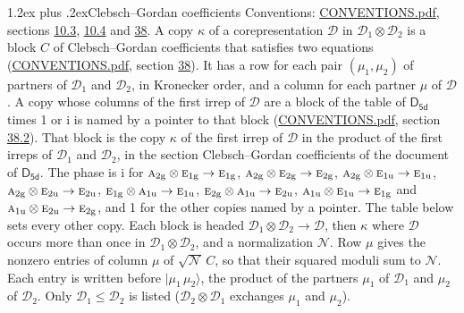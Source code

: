 \documentclass[10pt,a4paper]{article}
\makeatletter
\renewcommand\section{\@startsection{section}{1}{\z@}{-3ex plus -1ex minus -.2ex}%
  {1.2ex plus .2ex}{\normalfont\large\sffamily\bfseries\color{parttitle}}}
\numberwithin{equation}{section}
\newcommand{\grp}[1]{\mathsf{#1}}
\newcommand{\irr}[1]{\text{\normalfont\scshape #1}}
\newcommand{\ptag}[1]{\mathrm{#1}}
\newcommand{\iunit}{\mathrm{i}}
\newcommand{\irrprod}{\otimes}
\newcommand{\mult}{\kappa}
\newcommand{\intx}{\mu}
\newcommand{\cgnorm}{\mathcal{N}}
\newcommand{\prodket}[2]{\lvert {#1}\,{#2}\rangle}
\makeatother
\begin{document}
\section{Clebsch--Gordan coefficients}\label{s:clebsch_gordan}
Conventions: \href{../../CONVENTIONS.pdf}{CONVENTIONS.pdf}, sections \href{../../../rotation/CONVENTIONS.pdf\#conv.10.3}{10.3}, \href{../../../rotation/CONVENTIONS.pdf\#conv.10.4}{10.4} and \href{../../CONVENTIONS.pdf\#conv.38}{38}.
\leavevmode\label{n:index.copy}\label{n:matrix.cg.stored}A copy $\mult$ of a corepresentation $\mathcal{D}$ in $\mathcal{D}_1\irrprod\mathcal{D}_2$ is a block $C$ of Clebsch--Gordan coefficients that satisfies two equations (\href{../../CONVENTIONS.pdf}{CONVENTIONS.pdf}, section \href{../../CONVENTIONS.pdf\#conv.38}{38}). \label{n:index.cg}It has a row for each pair $(\intx_1, \intx_2)$ of partners of $\mathcal{D}_1$ and $\mathcal{D}_2$, in Kronecker order, and a column for each partner $\intx$ of $\mathcal{D}$.
A copy whose columns of the first irrep of $\mathcal{D}$ are a block of the table of $\grp{D_{5d}}$ times 1 or $\iunit$ is named by a pointer to that block (\href{../../CONVENTIONS.pdf}{CONVENTIONS.pdf}, section \href{../../CONVENTIONS.pdf\#conv.38.2}{38.2}). That block is the copy $\mult$ of the first irrep of $\mathcal{D}$ in the product of the first irreps of $\mathcal{D}_1$ and $\mathcal{D}_2$, in the section Clebsch--Gordan coefficients of the document of \href{../../../rotation/data/pdf/D5d.pdf}{$\grp{D_{5d}}$}. The phase is $\iunit$ for $\irr{a}_{2\ptag{g}}\irrprod \irr{e}_{1\ptag{g}}\to \irr{e}_{1\ptag{g}}$, $\irr{a}_{2\ptag{g}}\irrprod \irr{e}_{2\ptag{g}}\to \irr{e}_{2\ptag{g}}$, $\irr{a}_{2\ptag{g}}\irrprod \irr{e}_{1\ptag{u}}\to \irr{e}_{1\ptag{u}}$, $\irr{a}_{2\ptag{g}}\irrprod \irr{e}_{2\ptag{u}}\to \irr{e}_{2\ptag{u}}$, $\irr{e}_{1\ptag{g}}\irrprod \irr{a}_{1\ptag{u}}\to \irr{e}_{1\ptag{u}}$, $\irr{e}_{2\ptag{g}}\irrprod \irr{a}_{1\ptag{u}}\to \irr{e}_{2\ptag{u}}$, $\irr{a}_{1\ptag{u}}\irrprod \irr{e}_{1\ptag{u}}\to \irr{e}_{1\ptag{g}}$ and $\irr{a}_{1\ptag{u}}\irrprod \irr{e}_{2\ptag{u}}\to \irr{e}_{2\ptag{g}}$, and 1 for the other copies named by a pointer. The table below sets every other copy.
Each block is headed $\mathcal{D}_1\irrprod\mathcal{D}_2\to\mathcal{D}$, then $\mult$ where $\mathcal{D}$ occurs more than once in $\mathcal{D}_1\irrprod\mathcal{D}_2$, and a normalization $\cgnorm$. Row $\intx$ gives the nonzero entries of column $\intx$ of $\sqrt{\cgnorm}\,C$, so that their squared moduli sum to $\cgnorm$. \label{n:vector.ket.product}Each entry is written before $\prodket{\intx_1}{\intx_2}$, the product of the partners $\intx_1$ of $\mathcal{D}_1$ and $\intx_2$ of $\mathcal{D}_2$. Only $\mathcal{D}_1 \le \mathcal{D}_2$ is listed ($\mathcal{D}_2\irrprod\mathcal{D}_1$ exchanges $\intx_1$ and $\intx_2$).
\end{document}
